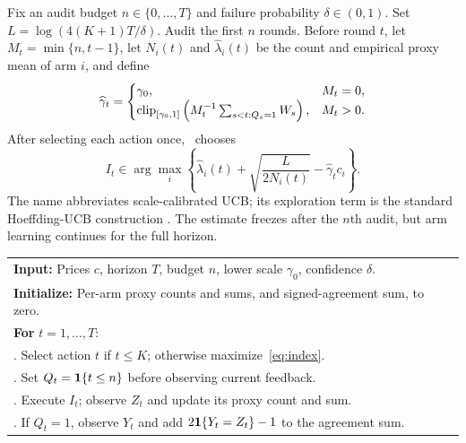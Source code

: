 Fix an audit budget $n\in\{0,\ldots,T\}$ and failure probability $\delta\in(0,1)$. Set $L=\log(4(K+1)T/\delta)$. Audit the first $n$ rounds. Before round $t$, let $M_t=\min\{n,t-1\}$, let $N_i(t)$ and $\widehat\lambda_i(t)$ be the count and empirical proxy mean of arm $i$, and define
\begin{equation}
\widehat\gamma_t=\begin{cases}
\gamma_0,&M_t=0,\\
\operatorname{clip}_{[\gamma_0,1]}\left(M_t^{-1}\sum_{s<t:Q_s=1}W_s\right),&M_t>0.
\end{cases}\label{eq:scaleestimate}
\end{equation}
After selecting each action once, \SC\ chooses
\begin{equation}
I_t\in\arg\max_i\left\{\widehat\lambda_i(t)+\sqrt{\frac{L}{2N_i(t)}}-\widehat\gamma_t c_i\right\}.
\label{eq:index}
\end{equation}
The name abbreviates scale-calibrated UCB; its exploration term is the standard Hoeffding-UCB construction \citep{auer2002}. The estimate freezes after the $n$th audit, but arm learning continues for the full horizon.

\begin{algorithm}[t]
\caption{\SC\ with a prefix audit budget}\label{alg:sc}
\begin{tabular}{@{}p{\linewidth}@{}}
\textbf{Input:} Prices $c$, horizon $T$, budget $n$, lower scale $\gamma_0$, confidence $\delta$.\\[2pt]
\textbf{Initialize:} Per-arm proxy counts and sums, and signed-agreement sum, to zero.\\[2pt]
\textbf{For} $t=1,\ldots,T$:\\
\quad 1. Select action $t$ if $t\leq K$; otherwise maximize~\eqref{eq:index}.\\
\quad 2. Set $Q_t=\mathbf{1}\{t\leq n\}$ before observing current feedback.\\
\quad 3. Execute $I_t$; observe $Z_t$ and update its proxy count and sum.\\
\quad 4. If $Q_t=1$, observe $Y_t$ and add $2\mathbf{1}\{Y_t=Z_t\}-1$ to the agreement sum.
\end{tabular}
\end{algorithm}

